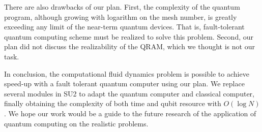 \documentclass[%
 reprint,
 amsmath,amssymb,
pra,
]{revtex4-1}
\begin{document}
\begin{itemize}
There are also drawbacks of our plan. First, the complexity of the quantum program, although growing with logarithm on the mesh number, is greatly exceeding any limit of the near-term quantum devices. That is, fault-tolerant quantum computing scheme must be realized to solve this problem. Second, our plan did not discuss the realizability of the QRAM, which we thought is not our task.

In conclusion, the computational fluid dynamics problem is possible to achieve speed-up with a fault tolerant quantum computer using our plan. We replace several modules in SU2 to adapt the quantum computer and classical computer, finally obtaining the complexity of both time and qubit resource with $O(\log N)$. We hope our work would be a guide to the future research of the application of quantum computing on the realistic problems.








\end{itemize}
\end{document}

